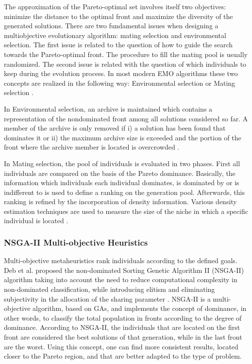 \documentclass[espaco=umemeio,chapter=TITLE,twoside,openright]{abnt}
\begin{document}
The approximation of the Pareto-optimal set involves itself two objectives: minimize the distance to the optimal front and maximize the diversity of the generated solutions. There are two fundamental issues when designing a multiobjective evolutionary algorithm: mating selection and environmental selection. The first issue is related to the question of how to guide the search towards the Pareto-optimal front. The procedure to fill the mating pool is usually randomized. The second issue is related with the question of which individuals to keep during the evolution process. In most modern EMO algorithms these two concepts are realized in the following way: Environmental selection or Mating selection \cite{Zitzler2001}.

In  Environmental selection, an archive is maintained which contains a representation of the nondominated front among all solutions considered so far. A member of the archive is only removed if i) a solution has been found that dominates it or ii) the maximum archive size is exceeded and the portion of the front where the archive member is located is overcrowded \cite{Zitzler2001}.

In Mating selection, the pool of individuals is evaluated in two phases. First all individuals are compared on the basis of the Pareto dominance. Basically, the information which individuals each individual dominates, is dominated by or is indifferent to is used to define a ranking on the generation pool. Afterwards, this ranking is refined by the incorporation of density information. Various density estimation techniques are used to measure the size of the niche in which a specific individual is located \cite{Zitzler2001}.


\subsubsection{NSGA-II Multi-objective Heuristics}


Multi-objective metaheuristics rank individuals according to the defined goals. Deb et al.  proposed the non-dominated Sorting Genetic Algorithm II (NSGA-II) algorithm taking into account the need to reduce computational complexity in non-dominated classification, while introducing elitism and eliminating subjectivity in the allocation of the sharing parameter \cite{Deb2000}. NSGA-II is a multi-objective algorithm, based on GAs, and implements the concept of dominance, in other words, to classify the total population in fronts according to the degree of dominance. According to NSGA-II, the individuals that are located on the first front are considered the best solutions of that generation, while in the last front are the worst. Using this concept, one can find more consistent results, located closer to the Pareto region, and that are better adapted to the type of problem.
\end{document}
